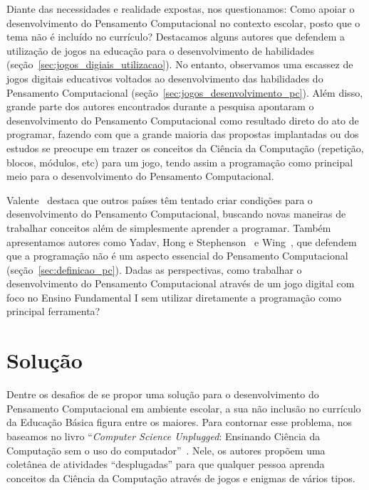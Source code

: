 Diante das necessidades e realidade expostas, nos questionamos: Como apoiar o desenvolvimento do Pensamento Computacional no contexto escolar, posto que o tema não é incluído no currículo? Destacamos alguns autores que defendem a utilização de jogos na educação para o desenvolvimento de habilidades (seção~\ref{sec:jogos_digiais_utilizacao}). No entanto, observamos uma escassez de jogos digitais educativos voltados ao desenvolvimento das habilidades do Pensamento Computacional (seção~\ref{sec:jogos_desenvolvimento_pc}). Além disso, grande parte dos autores encontrados durante a pesquisa apontaram o desenvolvimento do Pensamento Computacional como resultado direto do ato de programar, fazendo com que a grande maioria das propostas implantadas ou dos estudos se preocupe em trazer os conceitos da Ciência da Computação (repetição, blocos, módulos, etc) para um jogo, tendo assim a programação como principal meio para o desenvolvimento do Pensamento Computacional.

Valente~\cite{valente_integracao_2016} destaca que outros países têm tentado criar condições para o desenvolvimento do Pensamento Computacional, buscando novas maneiras de trabalhar conceitos além de simplesmente aprender a programar. Também apresentamos autores como Yadav, Hong e Stephenson~\cite{yadav_computational_2016} e Wing~\cite{wing_computational_2006}, que defendem que a programação não é um aspecto essencial do Pensamento Computacional (seção~\ref{sec:definicao_pc}). Dadas as perspectivas, como trabalhar o desenvolvimento do Pensamento Computacional através de um jogo digital com foco no Ensino Fundamental I sem utilizar diretamente a programação como principal ferramenta?

\section{Solução} \label{sec:solucao}

Dentre os desafios de se propor uma solução para o desenvolvimento do Pensamento Computacional em ambiente escolar, a sua não inclusão no currículo da Educação Básica figura entre os maiores. Para contornar esse problema, nos baseamos no livro “\textit{Computer Science Unplugged}: Ensinando Ciência da Computação sem o uso do computador”~\cite{bell_computer_2011}. Nele, os autores propõem uma coletânea de atividades “desplugadas” para que qualquer pessoa aprenda conceitos da Ciência da Computação através de jogos e enigmas de vários tipos.


